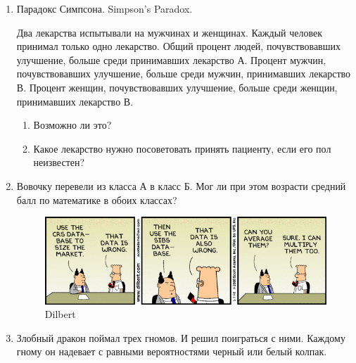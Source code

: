 \documentclass[nobib]{tufte-handout}
\begin{document}
\begin{enumerate}
\item Парадокс Симпсона.  Simpson's Paradox.

Два лекарства испытывали на мужчинах и женщинах. Каждый
человек принимал только одно лекарство. Общий процент людей,
почувствовавших улучшение, больше среди принимавших лекарство А.
Процент мужчин, почувствовавших улучшение, больше среди мужчин, принимавших лекарство В. Процент женщин, почувствовавших улучшение, больше среди женщин, принимавших лекарство В. 

\begin{enumerate}
\item Возможно ли это?
\item Какое лекарство нужно посоветовать принять пациенту, если его пол неизвестен?
\end{enumerate}
 

\item Вовочку перевели из класса А в класс Б. Мог ли при этом возрасти средний балл по математике в обоих классах?

\begin{figure}
  \includegraphics[width=17cm]{average.png}
  \caption{Dilbert}
\end{figure}



\item Злобный дракон поймал трех гномов. И решил поиграться с ними. Каждому гному он надевает с равными вероятностями черный или белый колпак. 



\end{enumerate}
\end{document}
